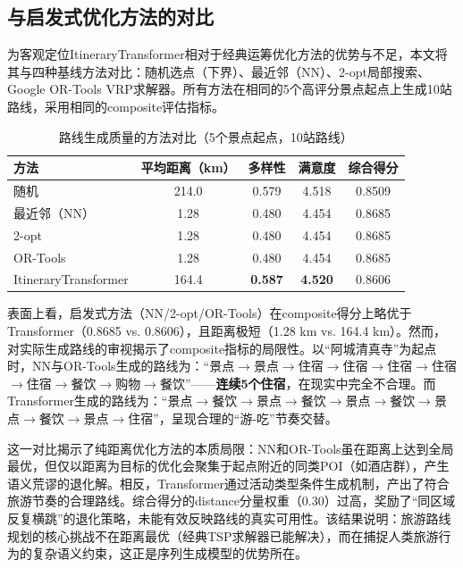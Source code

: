 \documentclass[12pt,a4paper]{ctexart}
\newenvironment{tighttable}
  {\setstretch{1.0}\small}
  {}
\begin{document}
\subsection{与启发式优化方法的对比}

为客观定位ItineraryTransformer相对于经典运筹优化方法的优势与不足，本文将其与四种基线方法对比：随机选点（下界）、最近邻（NN）、2-opt局部搜索、Google OR-Tools VRP求解器。所有方法在相同的5个高评分景点起点上生成10站路线，采用相同的composite评估指标。

\begin{table}[H]
\centering
\caption{路线生成质量的方法对比（5个景点起点，10站路线）}
\label{tab:baseline_comparison}
\begin{tighttable}
\begin{tabular}{lcccc}
\toprule
方法 & 平均距离（km） & 多样性 & 满意度 & 综合得分 \\
\midrule
随机 & 214.0 & 0.579 & 4.518 & 0.8509 \\
最近邻（NN） & 1.28 & 0.480 & 4.454 & 0.8685 \\
2-opt & 1.28 & 0.480 & 4.454 & 0.8685 \\
OR-Tools & 1.28 & 0.480 & 4.454 & 0.8685 \\
ItineraryTransformer & 164.4 & \textbf{0.587} & \textbf{4.520} & 0.8606 \\
\bottomrule
\end{tabular}
\end{tighttable}
\end{table}

表面上看，启发式方法（NN/2-opt/OR-Tools）在composite得分上略优于Transformer（0.8685 vs. 0.8606），且距离极短（1.28 km vs. 164.4 km）。然而，对实际生成路线的审视揭示了composite指标的局限性。以“阿城清真寺”为起点时，NN与OR-Tools生成的路线为：“景点$\to$景点$\to$住宿$\to$住宿$\to$住宿$\to$住宿$\to$住宿$\to$餐饮$\to$购物$\to$餐饮”——\textbf{连续5个住宿}，在现实中完全不合理。而Transformer生成的路线为：“景点$\to$餐饮$\to$景点$\to$餐饮$\to$景点$\to$餐饮$\to$景点$\to$餐饮$\to$景点$\to$住宿”，呈现合理的“游-吃”节奏交替。

这一对比揭示了纯距离优化方法的本质局限：NN和OR-Tools虽在距离上达到全局最优，但仅以距离为目标的优化会聚集于起点附近的同类POI（如酒店群），产生语义荒谬的退化解。相反，Transformer通过活动类型条件生成机制，产出了符合旅游节奏的合理路线。综合得分的distance分量权重（0.30）过高，奖励了“同区域反复横跳”的退化策略，未能有效反映路线的真实可用性。该结果说明：旅游路线规划的核心挑战不在距离最优（经典TSP求解器已能解决），而在捕捉人类旅游行为的复杂语义约束，这正是序列生成模型的优势所在。
\end{document}
